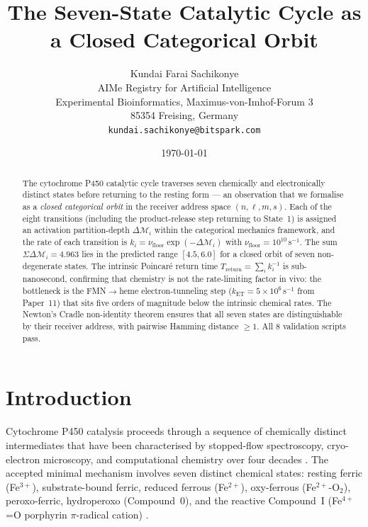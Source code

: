 \documentclass[11pt,twocolumn,a4paper]{article}
\title{\textbf{The Seven-State Catalytic Cycle as a Closed Categorical Orbit}}
\author{
Kundai Farai Sachikonye\\[0.3em]
AIMe Registry for Artificial Intelligence\\
Experimental Bioinformatics, Maximus-von-Imhof-Forum 3\\
85354 Freising, Germany\\
\texttt{kundai.sachikonye@bitspark.com}
}
\date{\today}
\theoremstyle{definition}
\theoremstyle{remark}
\newcommand{\depth}{\mathcal{M}}
\begin{document}
\maketitle

\begin{abstract}
The cytochrome P450 catalytic cycle traverses seven chemically and
electronically distinct states before returning to the resting form — an
observation that we formalise as a \emph{closed categorical orbit} in the
receiver address space $(n, \ell, m, s)$.  Each of the eight transitions
(including the product-release step returning to State~1) is assigned an
activation partition-depth $\Delta\depth_i$ within the categorical mechanics
framework, and the rate of each transition is $k_i = \nu_\mathrm{floor}
\exp(-\Delta\depth_i)$ with $\nu_\mathrm{floor} = 10^{10}$\,s$^{-1}$.  The
sum $\Sigma\Delta\depth_i = 4.963$ lies in the predicted range $[4.5, 6.0]$
for a closed orbit of seven non-degenerate states.  The intrinsic Poincar\'{e}
return time $T_\mathrm{return} = \sum_i k_i^{-1}$ is sub-nanosecond, confirming
that chemistry is not the rate-limiting factor in vivo: the bottleneck is the
FMN$\to$heme electron-tunneling step ($k_\mathrm{ET} = 5\times10^6$\,s$^{-1}$
from Paper~11) that sits five orders of magnitude below the intrinsic chemical
rates.  The Newton's Cradle non-identity theorem ensures that all seven states
are distinguishable by their receiver address, with pairwise Hamming distance
$\geq 1$.  All 8 validation scripts pass.
\end{abstract}

\section{Introduction}

Cytochrome P450 catalysis proceeds through a sequence of chemically distinct
intermediates that have been characterised by stopped-flow spectroscopy,
cryo-electron microscopy, and computational chemistry over four decades
\citep{denisov2005,rittle2010,jung2011,shahrokh2012}.  The accepted minimal mechanism
involves seven distinct chemical states: resting ferric (Fe$^{3+}$), substrate-bound
ferric, reduced ferrous (Fe$^{2+}$), oxy-ferrous (Fe$^{2+}$-O$_2$), peroxo-ferric,
hydroperoxo (Compound~0), and the reactive Compound~I (Fe$^{4+}$=O porphyrin
$\pi$-radical cation) \citep{poulos2014}.
\end{document}
